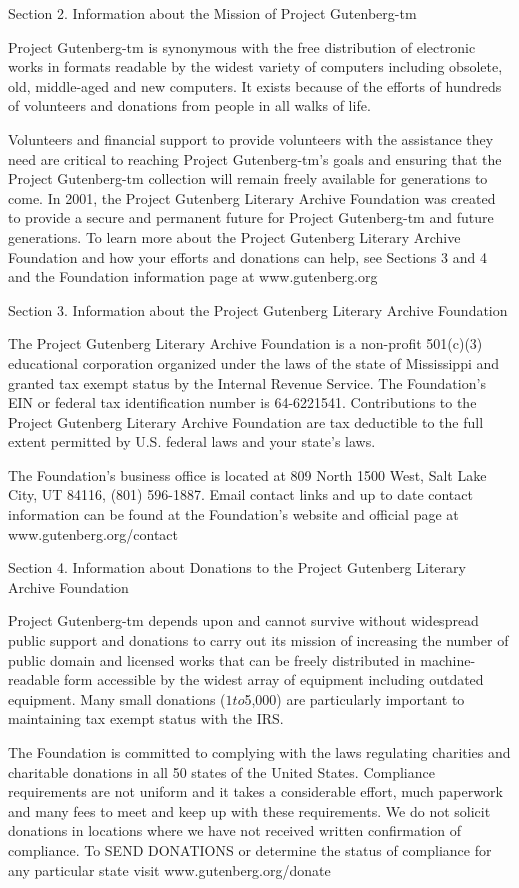 \documentclass[oneside]{book}
\begin{document}
\begin{text}
Section 2. Information about the Mission of Project Gutenberg-tm

Project Gutenberg-tm is synonymous with the free distribution of
electronic works in formats readable by the widest variety of
computers including obsolete, old, middle-aged and new computers. It
exists because of the efforts of hundreds of volunteers and donations
from people in all walks of life.

Volunteers and financial support to provide volunteers with the
assistance they need are critical to reaching Project Gutenberg-tm's
goals and ensuring that the Project Gutenberg-tm collection will
remain freely available for generations to come. In 2001, the Project
Gutenberg Literary Archive Foundation was created to provide a secure
and permanent future for Project Gutenberg-tm and future
generations. To learn more about the Project Gutenberg Literary
Archive Foundation and how your efforts and donations can help, see
Sections 3 and 4 and the Foundation information page at
www.gutenberg.org

Section 3. Information about the Project Gutenberg Literary
Archive Foundation

The Project Gutenberg Literary Archive Foundation is a non-profit
501(c)(3) educational corporation organized under the laws of the
state of Mississippi and granted tax exempt status by the Internal
Revenue Service. The Foundation's EIN or federal tax identification
number is 64-6221541. Contributions to the Project Gutenberg Literary
Archive Foundation are tax deductible to the full extent permitted by
U.S. federal laws and your state's laws.

The Foundation's business office is located at 809 North 1500 West,
Salt Lake City, UT 84116, (801) 596-1887. Email contact links and up
to date contact information can be found at the Foundation's website
and official page at www.gutenberg.org/contact

Section 4. Information about Donations to the Project Gutenberg
Literary Archive Foundation

Project Gutenberg-tm depends upon and cannot survive without
widespread public support and donations to carry out its mission of
increasing the number of public domain and licensed works that can be
freely distributed in machine-readable form accessible by the widest
array of equipment including outdated equipment. Many small donations
($1 to $5,000) are particularly important to maintaining tax exempt
status with the IRS.

The Foundation is committed to complying with the laws regulating
charities and charitable donations in all 50 states of the United
States. Compliance requirements are not uniform and it takes a
considerable effort, much paperwork and many fees to meet and keep up
with these requirements. We do not solicit donations in locations
where we have not received written confirmation of compliance. To SEND
DONATIONS or determine the status of compliance for any particular
state visit www.gutenberg.org/donate


\end{text}
\end{document}
